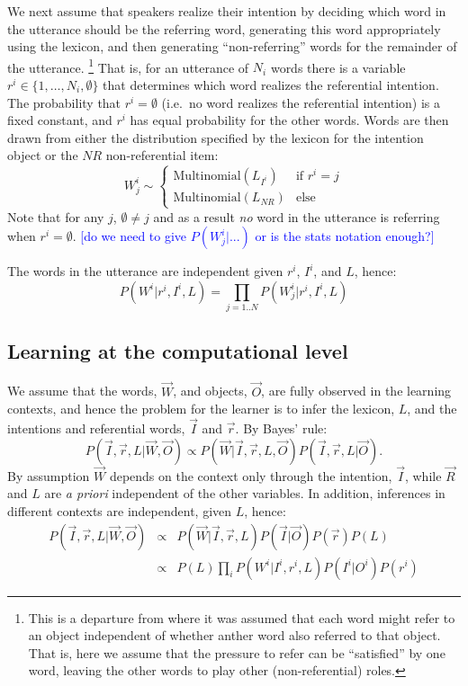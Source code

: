 \documentclass[man,noapacite,12pt]{apa2}
\newcommand{\nnote}[1]{\textcolor{blue}{[#1]}}
\begin{document}
We next assume that speakers realize their intention by deciding which word in the utterance should be the referring word, generating this word appropriately using the lexicon, and then generating ``non-referring'' words for the remainder of the utterance. \footnote{This is a departure from \cite{frank2009} where it was assumed that each word might refer to an object independent of whether anther word also referred to that object. That is, here we assume that the pressure to refer can be ``satisfied'' by one word, leaving the other words to play other (non-referential) roles.}
That is, for an utterance of $N_{i}$ words there is a variable $r^{i} \in \{1,\dots,N_{i}, \emptyset \}$ that determines which word realizes the referential intention. The probability that $r^{i}=\emptyset$ (i.e.~no word realizes the referential intention) is a fixed constant, and $r^{i}$ has equal probability for the other words.
Words are then drawn from either the distribution specified by the lexicon for the intention object or the $NR$ non-referential item:
\begin{equation}
W^{i}_{j} \sim 
\begin{cases}
\text{Multinomial}(L_{I^{i}}) & \text{if } r^{i}=j \\
\text{Multinomial}(L_{NR}) & \text{else}
\end{cases}
\end{equation}
Note that for any $j$, $\emptyset \neq j$ and as a result \emph{no} word in the utterance is referring when $r^{i}=\emptyset$.
\nnote{do we need to give $P(W^{i}_{j}|...)$ or is the stats notation enough?}

The words in the utterance are independent given $r^{i}$, $I^{i}$, and $L$, hence:
\begin{equation}
P(W^{i}|r^{i}, I^{i}, L) = \prod_{j=1..N}P(W^{i}_{j}|r^{i}, I^{i}, L)
\end{equation}


\subsection{Learning at the computational level}

We assume that the words, $\vec{W}$, and objects, $\vec{O}$, are fully observed in the learning contexts, and hence the problem for the learner is to infer the lexicon, $L$, and the intentions and referential words, $\vec{I}$ and $\vec{r}$. By Bayes' rule:
$$
P( \vec{I}, \vec{r}, L | \vec{W}, \vec{O}) \propto P(\vec{W}| \vec{I}, \vec{r}, L, \vec{O} )  P(\vec{I},\vec{r},L | \vec{O}).
$$
By assumption $\vec{W}$ depends on the context only through the intention, $\vec{I}$, while $\vec{R}$ and $L$ are \emph{a priori} independent of the other variables. In addition, inferences in different contexts are independent, given $L$, hence:
\begin{eqnarray}
P( \vec{I}, \vec{r}, L | \vec{W}, \vec{O}) &\propto& P(\vec{W}| \vec{I}, \vec{r}, L ) P(\vec{I} | \vec{O}) P(\vec{r})P(L) \\
&\propto& P(L) \prod_{i} P(W^{i}| I^{i}, r^{i}, L ) P(I^{i} | O^{i}) P(r^{i})
\end{eqnarray}
\end{document}
